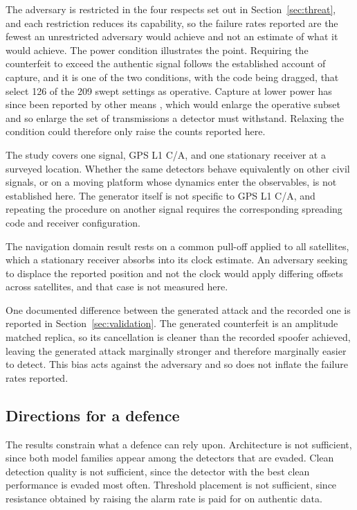 The adversary is restricted in the four respects set out in Section~\ref{sec:threat}, and
each restriction reduces its capability, so the failure rates reported are the fewest an
unrestricted adversary would achieve and not an estimate of what it would achieve. The power condition illustrates the point.
Requiring the counterfeit to exceed the authentic signal follows the established account
of capture, and it is one of the two conditions, with the code being dragged, that select
126 of the 209 swept settings as operative. Capture at lower power has since been reported by other means
\citep{liu2026dimas}, which would enlarge the operative subset and so enlarge the set of
transmissions a detector must withstand. Relaxing the condition could therefore only
raise the counts reported here.

The study covers one signal, GPS L1 C/A, and one stationary receiver at a surveyed
location. Whether the same detectors behave equivalently on other civil signals, or on a
moving platform whose dynamics enter the observables, is not established here. The
generator itself is not specific to GPS L1 C/A, and repeating the procedure on another
signal requires the corresponding spreading code and receiver configuration.

The navigation domain result rests on a common pull-off applied to all satellites, which a
stationary receiver absorbs into its clock estimate. An adversary seeking to displace the
reported position and not the clock would apply differing offsets across satellites,
and that case is not measured here.

One documented difference between the generated attack and the recorded one is reported in
Section~\ref{sec:validation}. The generated counterfeit is an amplitude matched replica, so
its cancellation is cleaner than the recorded spoofer achieved, leaving the generated
attack marginally stronger and therefore marginally easier to detect. This bias acts
against the adversary and so does not inflate the failure rates reported.

\subsection{Directions for a defence}

The results constrain what a defence can rely upon. Architecture is not sufficient, since
both model families appear among the detectors that are evaded. Clean detection quality is
not sufficient, since the detector with the best clean performance is evaded most often.
Threshold placement is not sufficient, since resistance obtained by raising the alarm rate
is paid for on authentic data.


